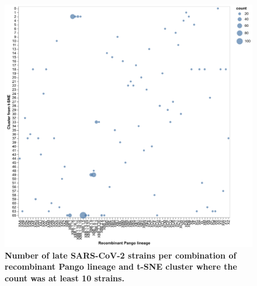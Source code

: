 \begin{figure}[!h]
\includegraphics[width=\columnwidth]{figures/sarscov2-test-tsne-recombinant-counts-Nextclade_pango_collapsed.png}
\caption{{\bf Number of late SARS-CoV-2 strains per combination of recombinant Pango lineage and t-SNE cluster where the count was at least 10 strains.}}\label{S_Fig_sarscov2_late_embeddings_tsne_recombinant_counts}
\end{figure}

